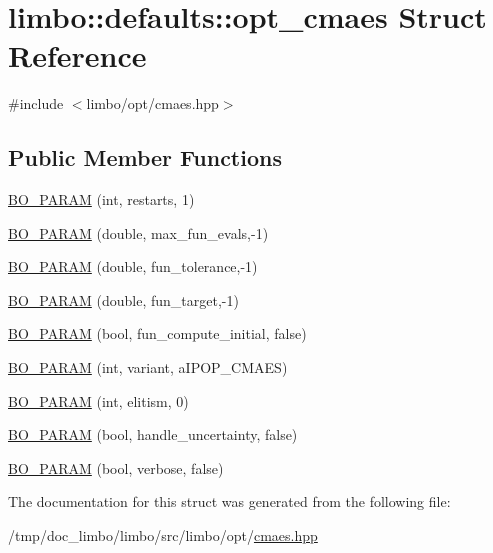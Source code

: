 \hypertarget{structlimbo_1_1defaults_1_1opt__cmaes}{}\section{limbo\+:\+:defaults\+:\+:opt\+\_\+cmaes Struct Reference}
\label{structlimbo_1_1defaults_1_1opt__cmaes}


{\ttfamily \#include $<$limbo/opt/cmaes.\+hpp$>$}

\subsection*{Public Member Functions}
\begin{DoxyCompactItemize}
\item 
\hyperlink{group__opt__defaults_gaba7127b5e591a72095bd6c3a4155828d}{B\+O\+\_\+\+P\+A\+R\+A\+M} (int, restarts, 1)
\item 
\hyperlink{group__opt__defaults_ga5130bd236acff913c59380059474ebab}{B\+O\+\_\+\+P\+A\+R\+A\+M} (double, max\+\_\+fun\+\_\+evals,-\/1)
\item 
\hyperlink{group__opt__defaults_ga5f980ba02cafe6ee52d6b9cd485e3d05}{B\+O\+\_\+\+P\+A\+R\+A\+M} (double, fun\+\_\+tolerance,-\/1)
\item 
\hyperlink{group__opt__defaults_ga1b4276da9161bb04b84b4cd9307a37ab}{B\+O\+\_\+\+P\+A\+R\+A\+M} (double, fun\+\_\+target,-\/1)
\item 
\hyperlink{group__opt__defaults_ga14aff955e1360233e5ac361bdd2f3118}{B\+O\+\_\+\+P\+A\+R\+A\+M} (bool, fun\+\_\+compute\+\_\+initial, false)
\item 
\hyperlink{group__opt__defaults_gaf6fe5f409527ed056cee8cf8df52da9e}{B\+O\+\_\+\+P\+A\+R\+A\+M} (int, variant, a\+I\+P\+O\+P\+\_\+\+C\+M\+A\+E\+S)
\item 
\hyperlink{group__opt__defaults_ga660850db2d1f35863416f9790fe5125e}{B\+O\+\_\+\+P\+A\+R\+A\+M} (int, elitism, 0)
\item 
\hyperlink{group__opt__defaults_gad4f97065dd716df6c84e093059ab39f6}{B\+O\+\_\+\+P\+A\+R\+A\+M} (bool, handle\+\_\+uncertainty, false)
\item 
\hyperlink{group__opt__defaults_gae78e735b53742e438847fb63817f2ed1}{B\+O\+\_\+\+P\+A\+R\+A\+M} (bool, verbose, false)
\end{DoxyCompactItemize}


The documentation for this struct was generated from the following file\+:\begin{DoxyCompactItemize}
\item 
/tmp/doc\+\_\+limbo/limbo/src/limbo/opt/\hyperlink{cmaes_8hpp}{cmaes.\+hpp}\end{DoxyCompactItemize}
